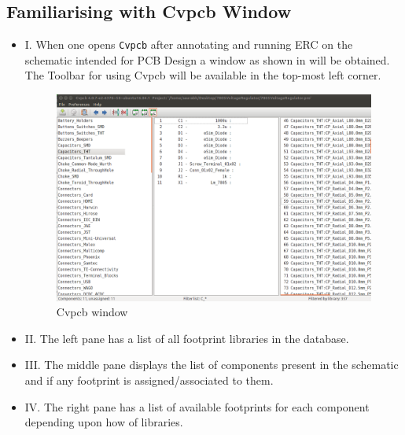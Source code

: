 \subsection{Familiarising with Cvpcb Window}
\begin{itemize}
\item I. When one opens \texttt{Cvpcb} after annotating and running ERC on the schematic intended for PCB Design a window as shown in  will be obtained. The Toolbar for using Cvpcb will be available in the top-most left corner.
\begin{figure}
\centering
\includegraphics[width=\lgfig]{NGHDL/cvpcb_unassigned.png}
\caption{Cvpcb window}
\label{cvpcb}
\end{figure}
\item II. The left pane has a list of all footprint libraries in the database.
\item III. The middle pane displays the list of components present in the schematic and if any footprint is assigned/associated to them.
\item IV. The right pane has a list of available footprints for each component depending upon how of libraries.
\end{itemize}



